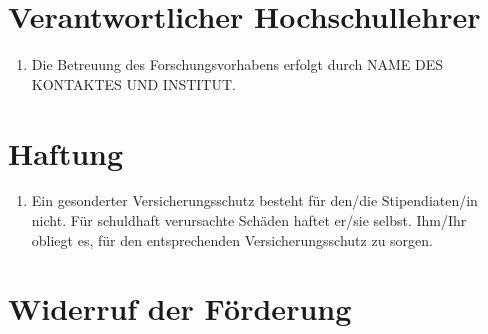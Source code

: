 \documentclass[
  paper=a4,
  fontsize=12pt,
  DIV=16,
  parskip=full,
  headinclude=true,
]{scrartcl}
\newcommand\stipbetreuung{NAME DES KONTAKTES UND INSTITUT}	%
\begin{document}
\section{Verantwortlicher Hochschullehrer}

\begin{enumerate}[\qquad(1)]
	\item Die Betreuung des Forschungsvorhabens erfolgt durch \stipbetreuung.
\end{enumerate}

\section{Haftung}

\begin{enumerate}[\qquad(1)]
	\item Ein gesonderter Versicherungsschutz besteht für den/die
		Stipendiaten/in nicht.
		Für schuldhaft verursachte Schäden haftet er/sie selbst.
		Ihm/Ihr obliegt es, für den entsprechenden Versicherungsschutz
		zu sorgen. 
\end{enumerate}

\section{Widerruf der Förderung}
\end{document}
